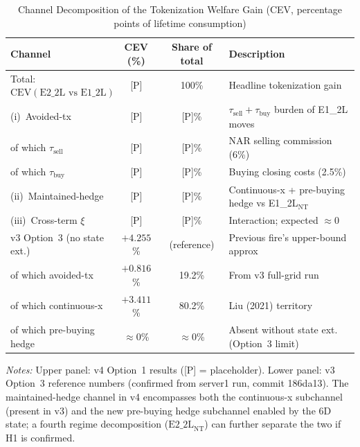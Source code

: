 \begin{table}[t]
\centering
\caption{Channel Decomposition of the Tokenization Welfare Gain
         (CEV, percentage points of lifetime consumption)}
\label{tab:decomp}
\small
\begin{tabular}{lccl}
\toprule
Channel & CEV (\%) & Share of total & Description \\
\midrule
Total: $\text{CEV}(\text{E2\_2L vs E1\_2L})$
    & \textsc{[P]} & 100\% & Headline tokenization gain \\
\addlinespace
\quad (i)~Avoided-tx
    & \textsc{[P]} & \textsc{[P]}\%
    & $\tau_{\text{sell}} + \tau_{\text{buy}}$ burden of E1\_2L moves \\
\qquad of which $\tau_{\text{sell}}$
    & \textsc{[P]} & \textsc{[P]}\%
    & NAR selling commission (6\%) \\
\qquad of which $\tau_{\text{buy}}$
    & \textsc{[P]} & \textsc{[P]}\%
    & Buying closing costs (2.5\%) \\[4pt]
\quad (ii)~Maintained-hedge
    & \textsc{[P]} & \textsc{[P]}\%
    & Continuous-x + pre-buying hedge vs E1\_2L$_\text{NT}$ \\[4pt]
\quad (iii)~Cross-term $\xi$
    & \textsc{[P]} & \textsc{[P]}\%
    & Interaction; expected $\approx 0$ \\
\midrule
v3 Option~3 (no state ext.)
    & $+4.255$\% & (reference) & Previous fire's upper-bound approx \\
\quad of which avoided-tx
    & $+0.816$\% & 19.2\% & From v3 full-grid run \\
\quad of which continuous-x
    & $+3.411$\% & 80.2\% & Liu (2021) territory \\
\quad of which pre-buying hedge
    & $\approx 0$\% & $\approx 0$\% & Absent without state ext. (Option~3 limit) \\
\bottomrule
\end{tabular}
\vspace{4pt}
\begin{minipage}{\linewidth}
\small\textit{Notes:}
Upper panel: v4 Option~1 results (\textsc{[P]} = placeholder).
Lower panel: v3 Option~3 reference numbers (confirmed from server1 run,
commit 186da13).
The maintained-hedge channel in v4 encompasses both the continuous-x
subchannel (present in v3) and the new pre-buying hedge subchannel
enabled by the 6D state; a fourth regime decomposition
($\text{E2\_2L}_{\text{NT}}$) can further separate the two if H1 is confirmed.
\end{minipage}
\end{table}

